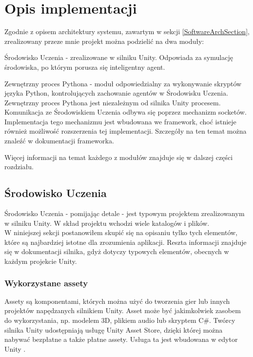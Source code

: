\chapter{Opis implementacji}
\label{ImplementationOverview}
Zgodnie z opisem architektury systemu, zawartym w sekcji \ref{SoftwareArchSection}, zrealizowany przeze mnie projekt można podzielić na dwa moduły:

\begin{enumerate*}
\item Środowisko Uczenia - zrealizowane w silniku Unity. Odpowiada za symulację środowiska, po którym porusza się inteligentny agent.
\item Zewnętrzny proces Pythona - moduł odpowiedzialny za wykonywanie skryptów języka Python, kontrolujących zachowanie agentów w Środowisku Uczenia. \\
Zewnętrzny proces Pythona jest niezależnym od silnika Unity procesem. Komunikacja ze Środowiskiem Uczenia odbywa się poprzez mechanizm socketów. Implementacja tego mechanizmu jest wbudowana we framework, choć istnieje również możliwość rozszerzenia tej implementacji. Szczegóły na ten temat można znaleźć w dokumentacji frameworka.
\end{enumerate*}

Więcej informacji na temat każdego z modułów znajduje się w dalszej części rozdziału.

\section{Środowisko Uczenia}
Środowisko Uczenia - pomijając detale - jest typowym projektem zrealizowanym w silniku Unity. W skład projektu wchodzi wiele katalogów i plików. \\
W niniejszej sekcji postanowiłem skupić się na opisaniu tylko tych elementów, które są najbardziej istotne dla zrozumienia aplikacji. Reszta informacji znajduje się w dokumentacji silnika, gdyż dotyczy typowych elementów, obecnych w każdym projekcie Unity.

\subsection{Wykorzystane assety}
Assety są komponentami, których można użyć do tworzenia gier lub innych projektów napędzanych silnikiem Unity. Asset może być jakimkolwiek zasobem do wykorzystania, np. modelem 3D, plikiem audio lub skryptem C\#. Twórcy silnika Unity udostępniają usługę Unity Asset Store, dzięki której można nabywać bezpłatne a także płatne assety. Usługa ta jest wbudowana w edytor Unity \cite{unity:assetStore}.

